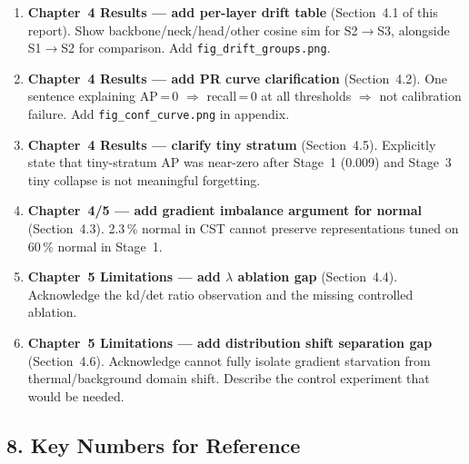 \begin{enumerate}
    \item \textbf{Chapter~4 Results --- add per-layer drift table} (Section~4.1
    of this report). Show backbone/neck/head/other cosine sim for S2$\to$S3,
    alongside S1$\to$S2 for comparison. Add \texttt{fig\_drift\_groups.png}.

    \item \textbf{Chapter~4 Results --- add PR curve clarification} (Section~4.2).
    One sentence explaining AP\,=\,0 $\Rightarrow$ recall\,=\,0 at all thresholds
    $\Rightarrow$ not calibration failure. Add \texttt{fig\_conf\_curve.png} in
    appendix.

    \item \textbf{Chapter~4 Results --- clarify tiny stratum} (Section~4.5).
    Explicitly state that tiny-stratum AP was near-zero after Stage~1 (0.009)
    and Stage~3 tiny collapse is not meaningful forgetting.

    \item \textbf{Chapter~4/5 --- add gradient imbalance argument for normal}
    (Section~4.3). 2.3\,\% normal in CST cannot preserve representations tuned
    on 60\,\% normal in Stage~1.

    \item \textbf{Chapter~5 Limitations --- add $\lambda$ ablation gap}
    (Section~4.4). Acknowledge the kd/det ratio observation and the missing
    controlled ablation.

    \item \textbf{Chapter~5 Limitations --- add distribution shift separation gap}
    (Section~4.6). Acknowledge cannot fully isolate gradient starvation from
    thermal/background domain shift. Describe the control experiment that would
    be needed.
\end{enumerate}

\subsection*{8. Key Numbers for Reference}


